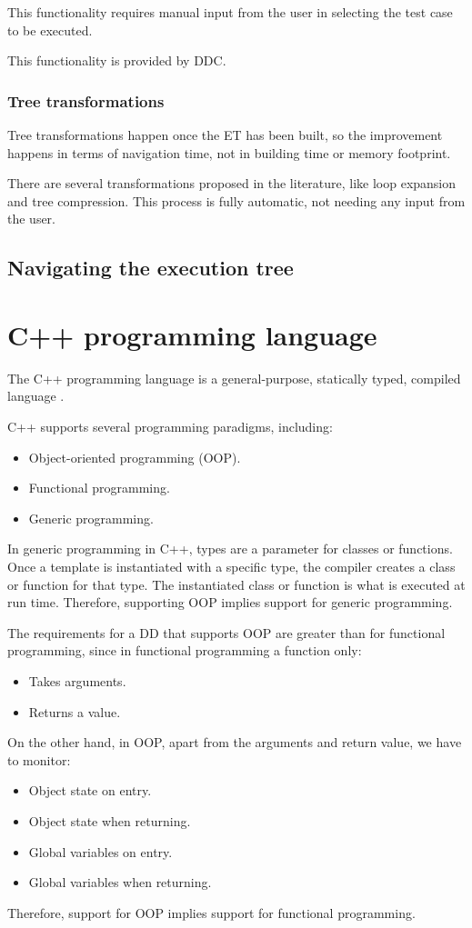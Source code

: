 This functionality requires manual input from the user in selecting the test case to be executed.

This functionality is provided by DDC.
\subsubsection{Tree transformations}
Tree transformations happen once the ET has been built, so the improvement happens in terms of navigation time, not in building time or memory footprint.

There are several transformations proposed in the literature, like loop expansion and tree compression.
This process is fully automatic, not needing any input from the user.
\subsection{Navigating the execution tree}
\section{C++ programming language}
The C++ programming language is a general-purpose, statically typed, compiled language \cite{cppHistory}.

C++ supports several programming paradigms, including:
\begin{itemize}
    \item Object-oriented programming (OOP).
    \item Functional programming.
    \item Generic programming.
\end{itemize}

In generic programming in C++, types are a parameter for classes or functions.
Once a template is instantiated with a specific type, the compiler creates a class or function for that type.
The instantiated class or function is what is executed at run time. Therefore, supporting OOP implies support for generic programming.

The requirements for a DD that supports OOP are greater than for functional programming, since in functional programming a function only:
\begin{itemize}
    \item Takes arguments.
    \item Returns a value.
\end{itemize}
On the other hand, in OOP, apart from the arguments and return value, we have to monitor:
\begin{itemize}
    \item Object state on entry.
    \item Object state when returning.
    \item Global variables on entry.
    \item Global variables when returning.
\end{itemize}
Therefore, support for OOP implies support for functional programming.

